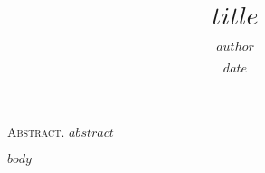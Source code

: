\documentclass[reqno,12pt]{amsart}
\title[$short_title$]
{\large $title$}
\author{$author$}
\date{$date$}
\begin{document}




\linenumbers
\modulolinenumbers[5]

\maketitle

\noindent\textsc{Abstract.}
$abstract$
 
\vspace{12pt}

\vspace{24pt}

$body$
\end{document}
